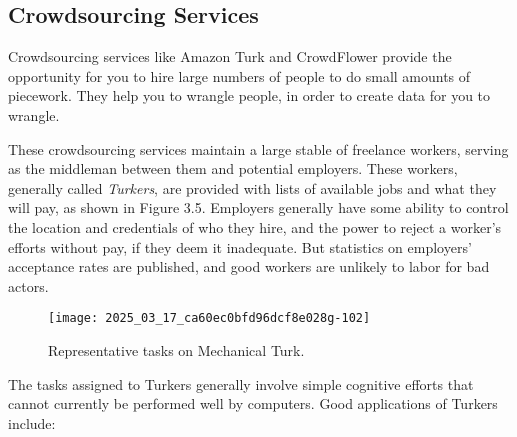 \documentclass[10pt]{article}
\begin{document}
\subsection{Crowdsourcing Services}

Crowdsourcing services like Amazon Turk and CrowdFlower provide the opportunity for you to hire large numbers of people to do small amounts of piecework. They help you to wrangle people, in order to create data for you to wrangle.

These crowdsourcing services maintain a large stable of freelance workers, serving as the middleman between them and potential employers. These workers, generally called \textit{Turkers}, are provided with lists of available jobs and what they will pay, as shown in Figure 3.5. Employers generally have some ability to control the location and credentials of who they hire, and the power to reject a worker's efforts without pay, if they deem it inadequate. But statistics on employers' acceptance rates are published, and good workers are unlikely to labor for bad actors.

\begin{figure}[h]
  \centering
  \texttt{[image: 2025\_03\_17\_ca60ec0bfd96dcf8e028g-102]}
  \caption{Representative tasks on Mechanical Turk.}
  \label{fig:tasks_mechanical_turk}
\end{figure}

The tasks assigned to Turkers generally involve simple cognitive efforts that cannot currently be performed well by computers. Good applications of Turkers include:
\end{document}
